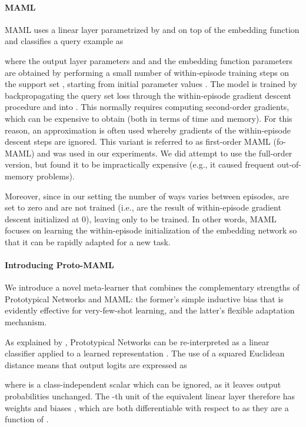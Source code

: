 \documentclass{article} \usepackage{iclr2020_conference,times}
\begin{document}
\paragraph{MAML} MAML uses a linear layer parametrized by  and
 on top of the embedding function  and
classifies a query example as

where the output layer parameters  and  and the
embedding function parameters  are obtained by performing a small
number of within-episode training steps on the support set , starting from
initial parameter values . The model is trained
by backpropagating the query set loss through the within-episode gradient
descent procedure and into . This normally
requires computing second-order gradients, which can be expensive to obtain
(both in terms of time and memory). For this reason, an approximation is often
used whereby gradients of the within-episode descent steps are ignored. This
variant is referred to as first-order MAML (fo-MAML) and was used in our
experiments. We did attempt to use the full-order version, but found it to be
impractically expensive (e.g., it caused frequent out-of-memory problems).

Moreover, since in our setting the number of ways varies between episodes,
 are set to zero and are not trained (i.e.,
 are the result of within-episode gradient descent
initialized at 0), leaving only  to be trained. In other words, MAML
focuses on learning the within-episode initialization  of the embedding
network so that it can be rapidly adapted for a new task.

\paragraph{Introducing Proto-MAML} We introduce a novel meta-learner that combines the complementary strengths of Prototypical Networks and MAML: the former's simple inductive bias that is evidently effective for very-few-shot learning, and the latter's flexible adaptation mechanism. 


As explained by \citet{snell2017prototypical}, Prototypical Networks can be
re-interpreted as a linear classifier applied to a learned representation
. The use of a squared Euclidean distance means that output
logits are expressed as

where  is a class-independent scalar which can be ignored, as it
leaves output probabilities unchanged. The -th unit of the equivalent
linear layer therefore has weights  and
biases , which are both differentiable with respect
to  as they are a function of .
\end{document}
